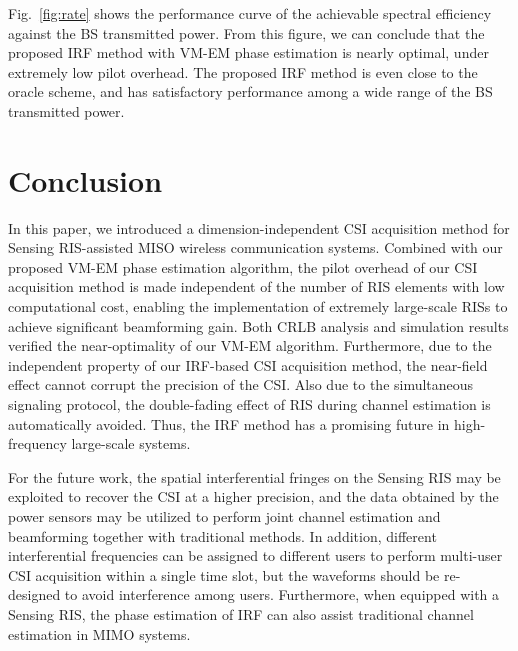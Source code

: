 \documentclass[12pt,draftclsnofoot,journal,onecolumn]{IEEEtran}
\theoremstyle{nonumberplain}
\begin{document}
    Fig.~\ref{fig:rate} shows the performance curve of the achievable spectral efficiency against the BS transmitted power. From this figure, we can conclude that the proposed IRF method with VM-EM phase estimation is nearly optimal, under extremely low pilot overhead. The proposed IRF method is even close to the oracle scheme, and has satisfactory performance among a wide range of the BS transmitted power. 



\section{Conclusion}
\label{Conclusion}
    In this paper, we introduced a dimension-independent CSI acquisition method for Sensing RIS-assisted MISO wireless communication systems. 
    Combined with our proposed VM-EM phase estimation algorithm, the pilot overhead of our CSI acquisition method is made independent of the number of RIS elements with low computational cost, enabling the implementation of extremely large-scale RISs to achieve significant beamforming gain. 
    Both CRLB analysis and simulation results verified the near-optimality of our VM-EM algorithm. 
    Furthermore, due to the independent property of our \ac{IRF}-based CSI acquisition method, the near-field effect cannot corrupt the precision of the CSI. 
    Also due to the simultaneous signaling protocol, the double-fading effect of RIS \cite{zhang2021active} during channel estimation is automatically avoided. 
    Thus, the \ac{IRF} method has a promising future in high-frequency large-scale systems. 
    
    For the future work, the spatial interferential fringes on the Sensing RIS may be exploited to recover the CSI at a higher precision, and the data obtained by the power sensors may be utilized to perform joint channel estimation and beamforming together with traditional methods. 
    In addition, different interferential frequencies can be assigned to different users to perform multi-user CSI acquisition within a single time slot, but the waveforms should be re-designed to avoid interference among users. 
    Furthermore, when equipped with a Sensing RIS, the phase estimation of IRF can also assist traditional channel estimation in MIMO systems. 

\appendices
\end{document}
